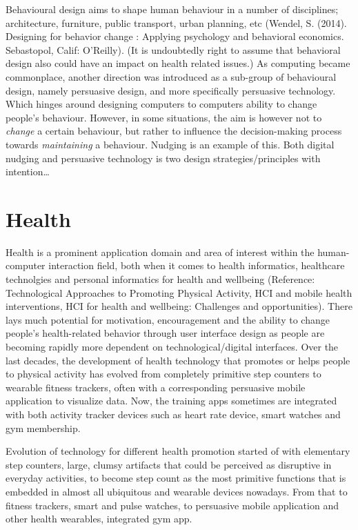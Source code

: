 Behavioural design aims to shape human behaviour in a number of disciplines; architecture, furniture, public transport, urban planning, etc (Wendel, S. (2014). Designing for behavior change : Applying psychology and behavioral economics. Sebastopol, Calif: O'Reilly). (It is undoubtedly right to assume that behavioral design also could have an impact on health related issues.) As computing became commonplace, another direction was introduced as a sub-group of behavioural design, namely persuasive design, and more specifically persuasive technology. Which hinges around designing computers to computers ability to change people's behaviour.  However, in some situations, the aim is however not to \textit{change} a certain behaviour, but rather to influence the decision-making process towards \textit{maintaining} a behaviour. Nudging is an example of this. Both digital nudging and persuasive technology is two design strategies/principles with intention… 


\section{Health}
Health is a prominent application domain and area of interest within the human-computer interaction field, both when it comes to health informatics, healthcare technolgies and personal informatics for health and wellbeing (Reference: Technological Approaches to Promoting Physical Activity, HCI and mobile health interventions, HCI for health and wellbeing: Challenges and opportunities). There lays much potential for motivation, encouragement and the ability to change people’s health-related behavior through user interface design as people are becoming rapidly more dependent on technological/digital interfaces. Over the last decades, the development of health technology that promotes or helps people to physical activity has evolved from completely primitive step counters to wearable fitness trackers, often with a corresponding persuasive mobile application to visualize data. Now, the training apps sometimes are integrated with both activity tracker devices  such as heart rate device, smart watches and gym membership. 

Evolution of technology for different health promotion started of with elementary step counters, large, clumsy artifacts that could be perceived as disruptive in everyday activities, to become step count as the most primitive functions that is embedded in almost all ubiquitous and wearable devices nowadays. From that to fitness trackers, smart and pulse watches, to persuasive mobile application and other health wearables, integrated gym app.

